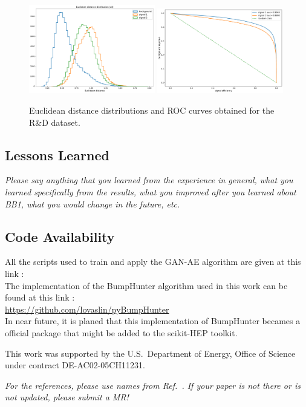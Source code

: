 \documentclass[letterpaper,11pt]{article}
\begin{document}
\begin{figure}[h!]
\centering
\includegraphics[width=0.49\textwidth]{img/RnD_single_distance_all.pdf}
\includegraphics[width=0.49\textwidth]{img/RnD_single_ROC_all.pdf}
\caption{Euclidean distance distributions and ROC curves obtained for the R\&D dataset.}
\label{fig:fig1}
\end{figure}


\subsection{Lessons Learned}
\label{sec:lessons}

\noindent \textit{Please say anything that you learned from the experience in general, what you learned specifically from the results, what you improved after you learned about BB1, what you would change in the future, etc.}

\subsection{Code Availability}
\label{code:code}

\noindent All the scripts used to train and apply the GAN-AE algorithm are given at this link :\\

\noindent The implementation of the BumpHunter algorithm used in this work can be found at this link :\\
\href{https://github.com/lovaslin/pyBumpHunter}{https://github.com/lovaslin/pyBumpHunter}\\
\noindent In near future, it is planed that this implementation of BumpHunter becames a official package that might be added to the scikit-HEP toolkit.

\acknowledgments

This work was supported by the U.S.~Department of Energy, Office of Science under contract DE-AC02-05CH11231. 

\vspace{10mm}

\noindent \textit{For the references, please use names from Ref.~\cite{hepmllivingreview}.  If your paper is not there or is not updated, please submit a MR!}



\end{document}
